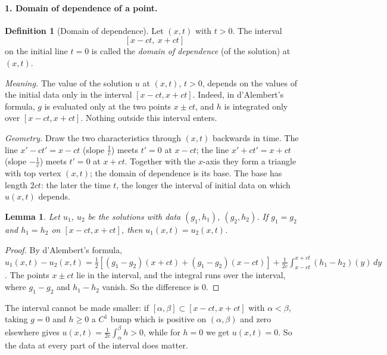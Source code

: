 \documentclass[11pt]{article}
\theoremstyle{plain}
\newtheorem{lemma}[theorem]{Lemma}
\theoremstyle{definition}
\newtheorem{definition}[theorem]{Definition}
\theoremstyle{remark}
\begin{document}
\paragraph{1. Domain of dependence of a point.}

\begin{definition}[Domain of dependence]\label{def:dod}
Let $(x,t)$ with $t > 0$. The interval
$$ [x - ct,\ x + ct] $$
on the initial line $t = 0$ is called the \emph{domain of dependence} (of the solution) at $(x,t)$.
\end{definition}

\emph{Meaning.} The value of the solution $u$ at $(x,t)$, $t > 0$, depends on the values of the initial data only in the interval $[x - ct, x + ct]$. Indeed, in d'Alembert's formula, $g$ is evaluated only at the two points $x \pm ct$, and $h$ is integrated only over $[x - ct, x + ct]$. Nothing outside this interval enters.

\emph{Geometry.} Draw the two characteristics through $(x,t)$ backwards in time. The line $x' - ct' = x - ct$ (slope $\frac1c$) meets $t' = 0$ at $x - ct$; the line $x' + ct' = x + ct$ (slope $-\frac1c$) meets $t' = 0$ at $x + ct$. Together with the $x$-axis they form a triangle with top vertex $(x,t)$; the domain of dependence is its base. The base has length $2ct$: the later the time $t$, the longer the interval of initial data on which $u(x,t)$ depends.

\begin{lemma}\label{lem:dod}
Let $u_1$, $u_2$ be the solutions with data $(g_1,h_1)$, $(g_2,h_2)$. If $g_1 = g_2$ and $h_1 = h_2$ on $[x - ct, x + ct]$, then $u_1(x,t) = u_2(x,t)$.
\end{lemma}
\begin{proof}
By d'Alembert's formula, $u_1(x,t) - u_2(x,t) = \frac12[(g_1 - g_2)(x + ct) + (g_1 - g_2)(x - ct)] + \frac{1}{2c}\int_{x-ct}^{x+ct}(h_1 - h_2)(y)\, dy$. The points $x \pm ct$ lie in the interval, and the integral runs over the interval, where $g_1 - g_2$ and $h_1 - h_2$ vanish. So the difference is $0$.
\end{proof}

The interval cannot be made smaller: if $[\alpha,\beta] \subset [x - ct, x + ct]$ with $\alpha < \beta$, taking $g = 0$ and $h \ge 0$ a $C^1$ bump which is positive on $(\alpha,\beta)$ and zero elsewhere gives $u(x,t) = \frac{1}{2c}\int_\alpha^\beta h > 0$, while for $h = 0$ we get $u(x,t) = 0$. So the data at every part of the interval does matter.
\end{document}
